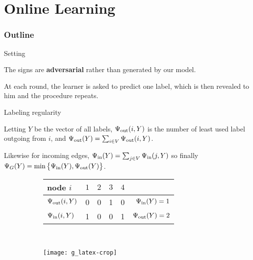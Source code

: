 \documentclass[10pt,svgnames,ignorenonframetext,final]{beamer}
\begin{document}
\section{Online Learning}\label{online-learning}
  \begin{frame} \frametitle{Outline} \tableofcontents[currentsection] \end{frame}

\begin{frame}{Setting}

The signs are \textbf{adversarial} rather than generated by our model.

At each round, the learner is asked to predict one label, which is then revealed to him and the
procedure repeats.

\end{frame}

\begin{frame}{Labeling regularity}


Letting $Y$ be the vector of all labels, $\Psi_{\mathrm{out}}(i, Y)$ is the number of least used label outgoing
from $i$, and $\Psi_{\mathrm{out}}(Y) = \sum_{i \in V} \Psi_{\mathrm{out}}(i,Y)$.

Likewise for incoming edges, \(\Psi_{\mathrm{in}}(Y) = \sum_{j \in V} \Psi_{\mathrm{in}}(j,Y)\) so finally
\(\Psi_G(Y) = \min\big\{\Psi_{\mathrm{in}}(Y), \Psi_{\mathrm{out}}(Y)\big\}\).

\begin{figure}[t]
  \centering
  \begin{subfigure}[t]{0.6\textwidth}
    \centering
    \vspace{-2cm}
    \begin{tabular}{lcccc|r}
      \toprule
      node $i$        & $1$ & $2$ & $3$ & $4$ &                  \\
      \midrule
      $\Psi_{\mathrm{out}}(i, Y)$ & 0   & 0   & 1   & 0   & $\Psi_{\mathrm{in}}(Y) = 1$  \\
      $\Psi_{\mathrm{in}}(i, Y)$  & 1   & 0   & 0   & 1   & $\Psi_{\mathrm{out}}(Y) = 2$ \\
      \bottomrule
    \end{tabular}
  \end{subfigure}~
  \begin{subfigure}[t]{0.35\textwidth}
    \centering \texttt{[image: g\_latex-crop]}
  \end{subfigure}
\end{figure}

\end{frame}
\end{document}
